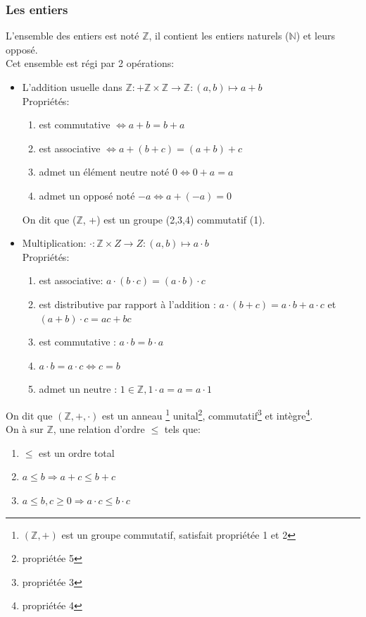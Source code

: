 \documentclass[11pt]{article}
\begin{document}
		\subsubsection{Les entiers}
			L'ensemble des entiers est noté $\mathbb Z$, il contient les entiers naturels ($\mathbb N$) et leurs opposé.\\
			Cet ensemble est régi par 2 opérations:
			\begin{itemize}
				\item L'addition usuelle dans $\mathbb Z : + \mathbb Z \times \mathbb Z \rightarrow \mathbb Z : (a,b) \mapsto a+b$\\
				Propriétés:
				\begin{enumerate}
					\item est commutative $\Leftrightarrow a + b = b + a$
					\item est associative $\Leftrightarrow a + (b + c) = (a + b) + c$
					\item admet un élément neutre noté $0 \Leftrightarrow 0 + a = a$
					\item admet un opposé noté $-a \Leftrightarrow a + (-a) = 0$
				\end{enumerate}
				On dit que ($\mathbb Z$, +) est un groupe (2,3,4) commutatif (1).

				\item Multiplication: $\cdot: \mathbb Z\times Z \to Z : (a,b) \mapsto a \cdot b$\\
				Propriétés:
					\begin{enumerate}
						\item est associative: $a\cdot(b\cdot c) = (a \cdot b) \cdot c$
						\item est distributive par rapport à l'addition : $a \cdot (b + c) = a\cdot b + a \cdot c$ et $(a+b)\cdot c = ac +bc$
						\item est commutative : $a \cdot b = b \cdot a$
						\item $a \cdot b = a \cdot c \Leftrightarrow c = b$
						\item admet un neutre : $1 \in \mathbb Z, 1 \cdot a = a = a \cdot 1$
					\end{enumerate}
			\end{itemize}
			On dit que $(\mathbb Z, + , \cdot)$ est un anneau \footnote{$(\mathbb Z,+)$ est un groupe commutatif, satisfait propriétée 1 et 2} unital\footnote{propriétée 5}, commutatif\footnote{propriétée 3} et intègre\footnote{propriétée 4}.\\

			On à sur $\mathbb Z$, une relation d'ordre $\leq$ tels que:
			\begin{enumerate}
				\item $\leq$ est un ordre total
				\item $a \leq b \Rightarrow a+c \leq b + c$
				\item $a \leq b, c \geq 0 \Rightarrow a \cdot c \leq b \cdot c$
			\end{enumerate}
\end{document}
